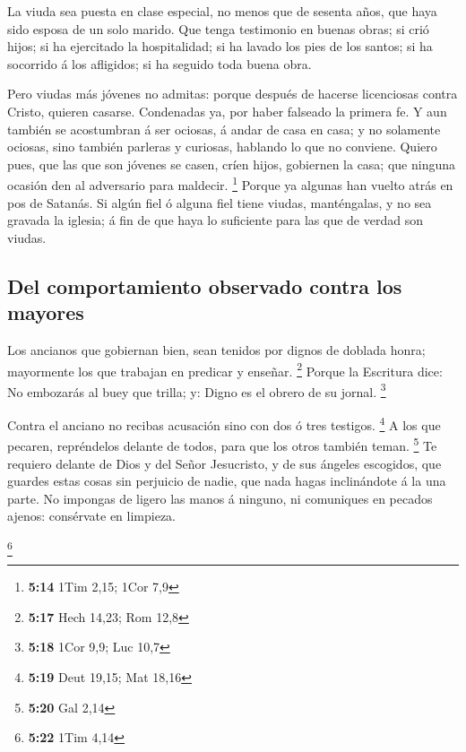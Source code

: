  La viuda sea puesta en clase especial, no menos que de
sesenta años, que haya sido esposa de un solo marido. 
Que tenga testimonio en buenas obras; si crió hijos; si ha ejercitado la
hospitalidad; si ha lavado los pies de los santos; si ha socorrido á los
afligidos; si ha seguido toda buena obra.

 Pero viudas más jóvenes no admitas: porque después de
hacerse licenciosas contra Cristo, quieren casarse. 
Condenadas ya, por haber falseado la primera fe.  Y aun
también se acostumbran á ser ociosas, á andar de casa en casa; y no
solamente ociosas, sino también parleras y curiosas, hablando lo que no
conviene.  Quiero pues, que las que son jóvenes se casen,
críen hijos, gobiernen la casa; que ninguna ocasión den al adversario
para maldecir. \footnote{\textbf{5:14} 1Tim 2,15; 1Cor 7,9}
 Porque ya algunas han vuelto atrás en pos de Satanás.
 Si algún fiel ó alguna fiel tiene viudas, manténgalas, y
no sea gravada la iglesia; á fin de que haya lo suficiente para las que
de verdad son viudas.

\hypertarget{del-comportamiento-observado-contra-los-mayores}{%
\subsection{Del comportamiento observado contra los
mayores}\label{del-comportamiento-observado-contra-los-mayores}}

 Los ancianos que gobiernan bien, sean tenidos por dignos
de doblada honra; mayormente los que trabajan en predicar y enseñar.
\footnote{\textbf{5:17} Hech 14,23; Rom 12,8}  Porque la
Escritura dice: No embozarás al buey que trilla; y: Digno es el obrero
de su jornal. \footnote{\textbf{5:18} 1Cor 9,9; Luc 10,7}

 Contra el anciano no recibas acusación sino con dos ó
tres testigos. \footnote{\textbf{5:19} Deut 19,15; Mat 18,16}
 A los que pecaren, repréndelos delante de todos, para
que los otros también teman. \footnote{\textbf{5:20} Gal 2,14}
 Te requiero delante de Dios y del Señor Jesucristo, y de
sus ángeles escogidos, que guardes estas cosas sin perjuicio de nadie,
que nada hagas inclinándote á la una parte.  No impongas
de ligero las manos á ninguno, ni comuniques en pecados ajenos:
consérvate en limpieza.

\footnote{\textbf{5:22} 1Tim 4,14}

